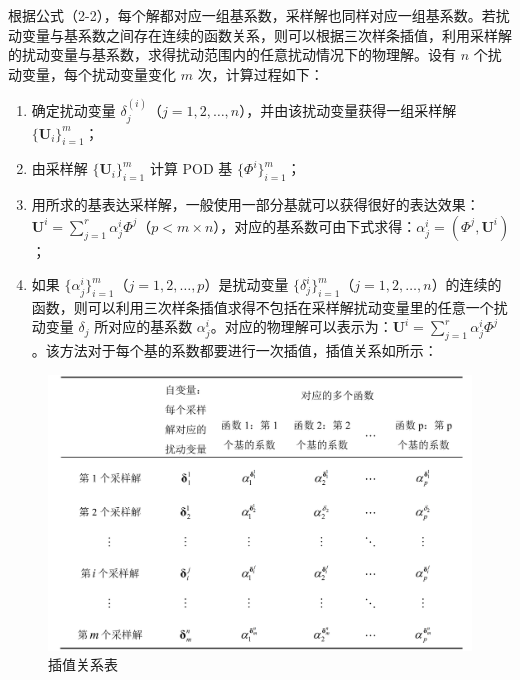 根据公式（2-2），每个解都对应一组基系数，采样解也同样对应一组基系数。若扰动变量与基系数之间存在连续的函数关系，则可以根据三次样条插值，利用采样解的扰动变量与基系数，求得扰动范围内的任意扰动情况下的物理解。设有 \(n\) 个扰动变量，每个扰动变量变化 \(m\) 次，计算过程如下：
\begin{enumerate}
    \item 确定扰动变量 \(\delta_j^{(i)}\)（\(j = 1, 2, \ldots, n\)），并由该扰动变量获得一组采样解 \(\{\mathbf{U}_i\}_{i=1}^m\)；
    
    \item 由采样解 \(\{\mathbf{U}_i\}_{i=1}^m\) 计算 POD 基 \(\{\Phi^i\}_{i=1}^m\)；
    
    \item 用所求的基表达采样解，一般使用一部分基就可以获得很好的表达效果：\(\mathbf{U}^i = \sum_{j=1}^r \alpha_j^i \Phi^j\)（\(p < m \times n\)），对应的基系数可由下式求得：\(\alpha_j^i = (\Phi^j, \mathbf{U}^i)\)；
    
    \item 如果 \(\{\alpha_j^i\}_{i=1}^m\)（\(j = 1, 2, \ldots, p\)）是扰动变量 \(\{\delta_j^i\}_{i=1}^m\)（\(j = 1, 2, \ldots, n\)）的连续的函数，则可以利用三次样条插值求得不包括在采样解扰动变量里的任意一个扰动变量 \(\delta_j\) 所对应的基系数 \(\alpha_j^i\)。对应的物理解可以表示为：\(\mathbf{U}^i = \sum_{j=1}^r \alpha_j^i \Phi^j\)。该方法对于每个基的系数都要进行一次插值，插值关系如\label{fig_result3}所示：
\end{enumerate}
 \begin{figure}[H]
    \centering
    \includegraphics[width=1.0\linewidth]{自变量_00.png}
    \caption{\songti 插值关系表\\}
    \label{fig_result3}
\end{figure}
